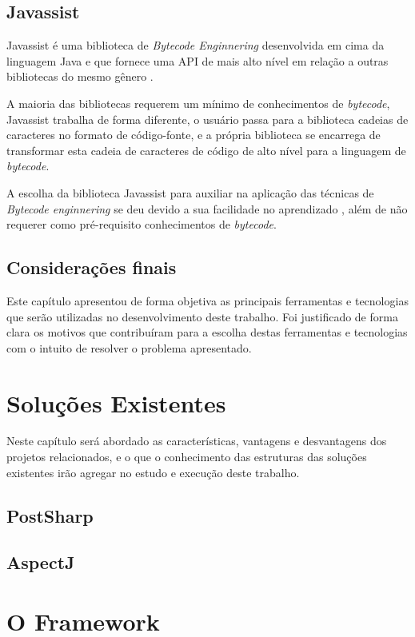 \documentclass[tc,oneside]{iiufrgs}
\begin{document}
\section{Javassist}

Javassist é uma biblioteca de \textit{Bytecode Enginnering} desenvolvida em cima da linguagem Java e que fornece uma API de mais alto nível em relação a outras bibliotecas do mesmo gênero \cite{javassist}.

A maioria das bibliotecas requerem um mínimo de conhecimentos de \textit{bytecode}, Javassist trabalha de forma diferente, o usuário passa para a biblioteca cadeias de caracteres no formato de código-fonte, e a própria biblioteca se encarrega de transformar esta cadeia de caracteres de código de alto nível para a linguagem de \textit{bytecode}.

A escolha da biblioteca Javassist para auxiliar na aplicação das técnicas de \textit{Bytecode enginnering} se deu devido a sua facilidade no aprendizado , além de não requerer como pré-requisito conhecimentos de \textit{bytecode}.

\section{Considerações finais}

Este capítulo apresentou de forma objetiva as principais ferramentas e tecnologias que serão utilizadas no desenvolvimento deste trabalho. Foi justificado de forma clara os motivos que contribuíram para a escolha destas ferramentas e tecnologias com o intuito de resolver o problema apresentado.

\chapter{Soluções Existentes}
Neste capítulo será abordado as características, vantagens e desvantagens dos projetos relacionados, e o que o conhecimento das estruturas das soluções existentes irão agregar no estudo e execução deste trabalho.

\section{PostSharp}

\section{AspectJ}

\chapter{O Framework}
\label{cap7}
\end{document}
